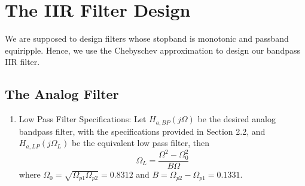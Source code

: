 \documentclass{article}
\begin{document}
\section{The IIR Filter Design}
We are supposed to design filters whose stopband is monotonic and passband equiripple.  
Hence, we use the Chebyschev approximation to design our bandpass IIR filter.
\subsection{The Analog Filter}
\begin{enumerate}

\item {Low Pass Filter Specifications:}  Let $H_{a, BP}(j\Omega)$ be the desired analog bandpass filter,  with the specifications provided in Section 2.2, and $H_{a,LP}(j\Omega_L)$ be the equivalent low pass filter, then
\begin{equation}
\Omega_L = \frac{\Omega^2 - \Omega_0^2}{B\Omega} \label{eq:freq_transform}
\end{equation}
where $\Omega_0 = \sqrt{\Omega_{p1}\Omega_{p2}} = 0.8312$ and $B = \Omega_{p2} - \Omega_{p1} = 0.1331$.


\end{enumerate}
\end{document}
